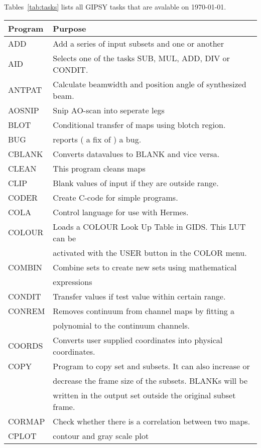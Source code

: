 Tables~\ref{tab:tasks} lists all GIPSY tasks that are avalable on \today. 

\begin{table}
\begin{center}
\begin{tabular}{ | l | l | }
\hline
Program & Purpose \\
\hline
ADD & Add a series of input subsets and one or another \\
AID & Selects one of the tasks SUB, MUL, ADD, DIV or CONDIT.\\
ANTPAT &  Calculate beamwidth and position angle of synthesized beam.\\
AOSNIP & Snip AO-scan into seperate legs \\ 
BLOT & Conditional transfer of maps using blotch region.\\
BUG  & reports ( a fix of ) a bug. \\
CBLANK & Converts datavalues to BLANK and vice versa.\\
CLEAN & This program cleans maps\\
CLIP &  Blank values of input if they are outside range.\\
CODER & Create C-code for simple programs.\\
COLA & Control language for use with Hermes.\\
COLOUR & Loads a COLOUR Look Up Table in GIDS. This LUT can be\\
       & activated with the USER button in the COLOR menu.\\
COMBIN & Combine sets to create new sets using mathematical\\
       & expressions\\
CONDIT & Transfer values if test value within certain range.\\
CONREM & Removes continuum from channel maps by fitting a\\
       & polynomial to the continuum channels.\\
COORDS & Converts user supplied coordinates into physical coordinates.\\
COPY   & Program to copy set and subsets. It can also increase or\\
       & decrease the frame size of the subsets. BLANKs will be\\
       & written in the output set outside the original subset frame.\\
CORMAP & Check whether there is a correlation between two maps.\\
CPLOT  & contour and gray scale plot\\

\end{tabular}
\end{center}
\end{table}
